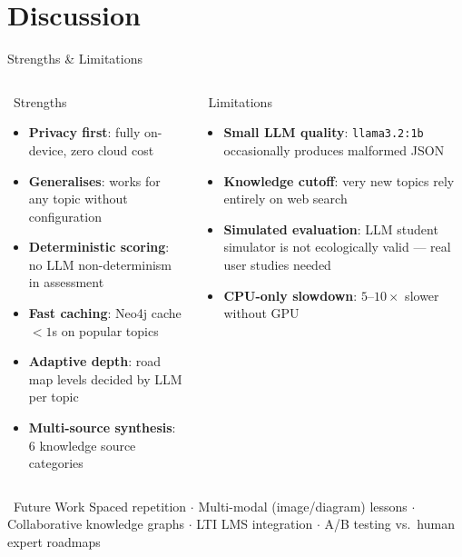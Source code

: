 \documentclass[aspectratio=169,9pt]{beamer}
\begin{document}
\section{Discussion}

\begin{frame}{Strengths \& Limitations}
\begin{columns}[T]
  \begin{exampleblock}{\faThumbsUp\ Strengths}
    \begin{itemize}
      \item \textbf{Privacy first}: fully on-device, zero cloud cost
      \item \textbf{Generalises}: works for any topic without configuration
      \item \textbf{Deterministic scoring}: no LLM non-determinism in assessment
      \item \textbf{Fast caching}: Neo4j cache $< 1$s on popular topics
      \item \textbf{Adaptive depth}: road map levels decided by LLM per topic
      \item \textbf{Multi-source synthesis}: 6 knowledge source categories
    \end{itemize}
  \end{exampleblock}

  \begin{alertblock}{\faExclamationTriangle\ Limitations}
    \begin{itemize}
      \item \textbf{Small LLM quality}: \texttt{llama3.2:1b} occasionally produces malformed JSON
      \item \textbf{Knowledge cutoff}: very new topics rely entirely on web search
      \item \textbf{Simulated evaluation}: LLM student simulator is not ecologically valid — real user studies needed
      \item \textbf{CPU-only slowdown}: $5$--$10\times$ slower without GPU
    \end{itemize}
  \end{alertblock}
\end{columns}

\vspace{0.3cm}
\begin{block}{\faRoad\ Future Work}
  \small
  Spaced repetition $\cdot$ Multi-modal (image/diagram) lessons $\cdot$ Collaborative knowledge graphs $\cdot$ LTI LMS integration $\cdot$ A/B testing vs.\ human expert roadmaps
\end{block}
\end{frame}
\end{document}
